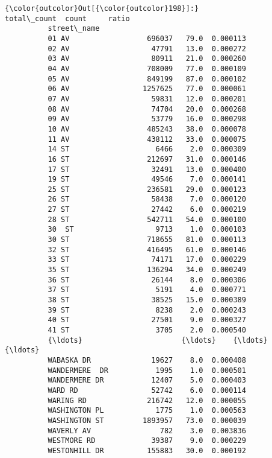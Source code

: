 \documentclass[11pt]{article}
\begin{document}
\begin{Verbatim}[commandchars=\\\{\}]
{\color{outcolor}Out[{\color{outcolor}198}]:}                   total\_count  count     ratio
          street\_name                                   
          01 AV                  696037   79.0  0.000113
          02 AV                   47791   13.0  0.000272
          03 AV                   80911   21.0  0.000260
          04 AV                  708009   77.0  0.000109
          05 AV                  849199   87.0  0.000102
          06 AV                 1257625   77.0  0.000061
          07 AV                   59831   12.0  0.000201
          08 AV                   74704   20.0  0.000268
          09 AV                   53779   16.0  0.000298
          10 AV                  485243   38.0  0.000078
          11 AV                  438112   33.0  0.000075
          14 ST                    6466    2.0  0.000309
          16 ST                  212697   31.0  0.000146
          17 ST                   32491   13.0  0.000400
          19 ST                   49546    7.0  0.000141
          25 ST                  236581   29.0  0.000123
          26 ST                   58438    7.0  0.000120
          27 ST                   27442    6.0  0.000219
          28 ST                  542711   54.0  0.000100
          30  ST                   9713    1.0  0.000103
          30 ST                  718655   81.0  0.000113
          32 ST                  416495   61.0  0.000146
          33 ST                   74171   17.0  0.000229
          35 ST                  136294   34.0  0.000249
          36 ST                   26144    8.0  0.000306
          37 ST                    5191    4.0  0.000771
          38 ST                   38525   15.0  0.000389
          39 ST                    8238    2.0  0.000243
          40 ST                   27501    9.0  0.000327
          41 ST                    3705    2.0  0.000540
          {\ldots}                       {\ldots}    {\ldots}       {\ldots}
          WABASKA DR              19627    8.0  0.000408
          WANDERMERE  DR           1995    1.0  0.000501
          WANDERMERE DR           12407    5.0  0.000403
          WARD RD                 52742    6.0  0.000114
          WARING RD              216742   12.0  0.000055
          WASHINGTON PL            1775    1.0  0.000563
          WASHINGTON ST         1893957   73.0  0.000039
          WAVERLY AV                782    3.0  0.003836
          WESTMORE RD             39387    9.0  0.000229
          WESTONHILL DR          155883   30.0  0.000192

\end{Verbatim}
\end{document}
